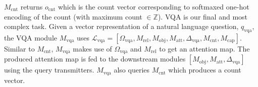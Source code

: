 \documentclass{article}
\makeatletter
\def\Mobj{M_\mathrm{obj}}
\def\Matt{M_\mathrm{att}}
\def\Mrel{M_\mathrm{rel}}
\def\Mcnt{M_\mathrm{cnt}}
\def\Mcap{M_\mathrm{cap}}
\def\Mvqa{M_\mathrm{vqa}}
\DeclareRobustCommand\onedot{\futurelet\@let@token\@onedot}
\def\@onedot{\ifx\@let@token.\else.\null\fi\xspace}
\def\eg{\emph{e.g}\onedot} \def\Eg{\emph{E.g}\onedot}
\makeatother
\begin{document}
$\Mcnt$ returns $o_\mathrm{cnt}$ which is the count vector corresponding to softmaxed one-hot encoding of the count (with maximum count $\in \mathbb{Z}$). %
VQA is our final and most complex task.
Given a vector representation of a natural language question, $q_\mathrm{vqa}$, the VQA module $\Mvqa$ uses $\mathcal L_\mathrm{vqa} = [\Omega_\mathrm{vqa}, \Mrel, \Mobj, \Matt, \Delta_\mathrm{vqa}, \Mcnt, \Mcap]$.
Similar to $\Mcnt$, $\Mvqa$ makes use of $\Omega_\mathrm{vqa}$ and $\Mrel$ to get an attention map.
The produced attention map is fed to the downstream modules $[\Mobj, \Matt, \Delta_\mathrm{vqa}]$ using the query transmitters.
$\Mvqa$ also queries $\Mcnt$ which produces a count vector.
\end{document}
